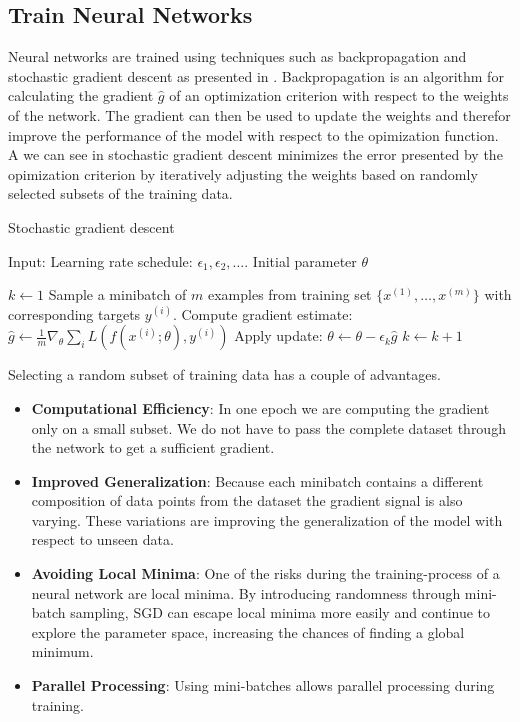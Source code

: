 \subsection{Train Neural Networks}

Neural networks are trained using techniques such as backpropagation and stochastic gradient descent as presented in . Backpropagation is an algorithm for calculating the gradient $\hat{g}$ of an optimization criterion with respect to the weights of the network. The gradient can then be used to update the weights and therefor improve the performance of the model with respect to the opimization function. A we can see in  stochastic gradient descent minimizes the error presented by the opimization criterion by iteratively adjusting the weights based on randomly selected subsets of the training data. 

\begin{algorithm}
    \caption{Stochastic gradient descent}\label{alg:SGD}
    \begin{algorithmic}
        \State{} Input: Learning rate schedule: $\epsilon_1, \epsilon_2, \ldots$. Initial parameter $\theta$

        \State{} $k \leftarrow 1$
            \State{} Sample a minibatch of $m$ examples from training set $\{x^{(1)}, \ldots, x^{(m)}\}$ with corresponding targets $y^{(i)}$.
            \State{} Compute gradient estimate:
            \State{} $\hat{g} \leftarrow \frac{1}{m}\nabla_\theta \sum_i L(f(x^{(i)}; \theta), y^{(i)})$
            \State{} Apply update:
            \State{} $\theta \leftarrow \theta - \epsilon_k \hat{g}$
            \State{} $k \leftarrow k + 1$
        \EndWhile{}
\end{algorithmic}
\end{algorithm} 

Selecting a random subset of training data has a couple of advantages. 
\begin{itemize}
	\item \textbf{Computational Efficiency}: In one epoch we are computing the gradient only on a small subset. We do not have to pass the complete dataset through the network to get a sufficient gradient.
	\item \textbf{Improved Generalization}: Because each minibatch contains a different composition of data points from the dataset the gradient signal is also varying. These variations are improving the generalization of the model with respect to unseen data.
	\item \textbf{Avoiding Local Minima}: One of the risks during the training-process of a neural network are local minima. By introducing randomness through mini-batch sampling, SGD can escape local minima more easily and continue to explore the parameter space, increasing the chances of finding a global minimum.
	\item \textbf{Parallel Processing}: Using mini-batches allows parallel processing during training. 
\end{itemize}

